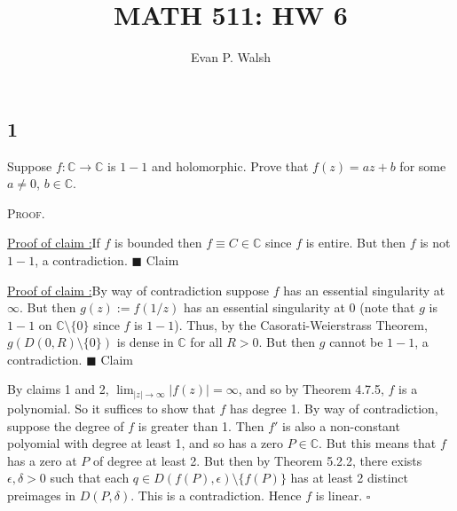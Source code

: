 \documentclass[12pt]{article}
\title{MATH 511: HW 6}
\author{Evan P. Walsh}
\newcounter{ProofCounter}
\newcounter{ClaimCounter}[ProofCounter]
\newenvironment{Proof}{\stepcounter{ProofCounter}\textsc{Proof.}}{\hfill$\square$}
\newenvironment{claim}[1]{\vspace{1mm}\stepcounter{ClaimCounter}\par\noindent\underline{\bf Claim \theClaimCounter:}\space#1}{}
\newenvironment{claimproof}[1]{\par\noindent\underline{Proof of claim \theClaimCounter:}\space#1}{\hfill $\blacksquare$ Claim \theClaimCounter}
\begin{document}
\maketitle


\subsection*{1}
\begin{tcolorbox}
  Suppose $f : \mathbb{C} \rightarrow \mathbb{C}$ is $1-1$ and holomorphic. Prove that $f(z) = az + b$ for some $a \neq 0$, $b \in \mathbb{C}$.  
\end{tcolorbox}
\begin{Proof}
  \begin{claimproof}
    If $f$ is bounded then $f \equiv C \in \mathbb{C}$ since $f$ is entire. But then $f$ is not $1-1$, a contradiction.
  \end{claimproof}

  \begin{claimproof}
    By way of contradiction suppose $f$ has an essential singularity at $\infty$. But then $g(z) := f(1/z)$ has an essential singularity at $0$ (note 
    that $g$ is $1-1$ on $\mathbb{C} \setminus \{0\}$ since $f$ is $1-1$). 
    Thus, by the Casorati-Weierstrass Theorem, $g(D(0,R)\setminus \{0\})$ is dense in $\mathbb{C}$ for all $R > 0$. 
    But then $g$ cannot be $1-1$, a contradiction.
  \end{claimproof}

  By claims 1 and 2, $\lim_{|z|\rightarrow\infty}|f(z)| = \infty$, and so by Theorem 4.7.5, $f$ is a polynomial. So it suffices to show that $f$ has
  degree 1. By way of contradiction, suppose the degree of $f$ is greater than 1. Then $f'$ is also a non-constant polyomial with degree at least 1, and
  so has a zero $P \in \mathbb{C}$. But this means that $f$ has a zero at $P$ of degree at least 2. But then by Theorem 5.2.2, there exists $\epsilon,
  \delta > 0$ such that each $q \in D(f(P),\epsilon) \setminus \{f(P)\}$ has at least 2 distinct preimages in $D(P,\delta)$. This is a contradiction.
  Hence $f$ is linear.
\end{Proof}


\newpage
\end{document}
